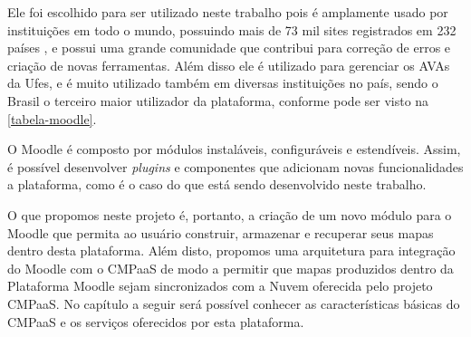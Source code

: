 \documentclass[
	12pt,				%
	openright,			%
	oneside,			%
	a4paper,			%
	english,			%
	french,				%
	spanish,			%
	brazil				%
	]{abntex2}
\begin{document}
Ele foi escolhido para ser utilizado neste trabalho pois é amplamente usado por instituições em todo o mundo, possuindo mais de 73 mil sites registrados em 232 países \cite{MoodleStat2016}, e possui uma grande comunidade que contribui para correção de erros e criação de novas ferramentas. Além disso ele é utilizado para gerenciar os AVAs da Ufes, e é muito utilizado também em diversas instituições no país, sendo o Brasil o terceiro maior utilizador da plataforma, conforme pode ser visto na \autoref{tabela-moodle}.



O Moodle é composto por módulos instaláveis, configuráveis e estendíveis. Assim, é possível desenvolver \textit{plugins} e componentes que adicionam novas funcionalidades a plataforma, como é o caso do que está sendo desenvolvido neste trabalho.

O que propomos neste projeto é, portanto, a criação de um novo módulo para o Moodle que permita ao usuário construir, armazenar e recuperar seus mapas dentro desta plataforma. Além disto, propomos uma arquitetura para integração do Moodle com o CMPaaS de modo a permitir que mapas produzidos dentro da Plataforma Moodle sejam sincronizados com a Nuvem oferecida pelo projeto CMPaaS. No capítulo a seguir será possível conhecer as características básicas do CMPaaS e os serviços oferecidos por esta plataforma.

\begin{table}[htb]
\end{table}
\end{document}
